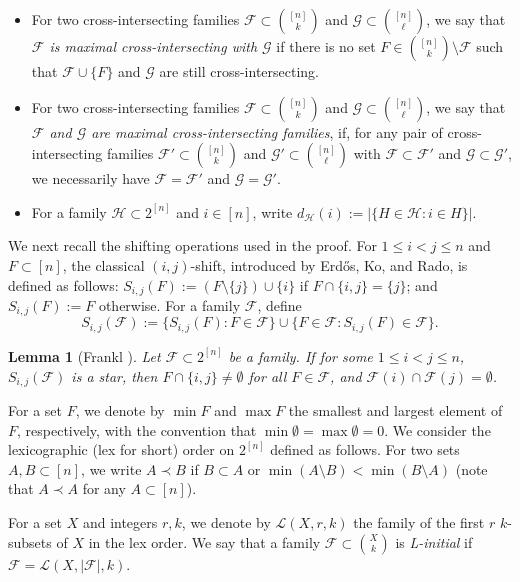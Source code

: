 \documentclass[a4paper,11pt]{article}
\newtheorem{lemma}[theorem]{Lemma}
\newcommand{\m}{\mathcal}
\begin{document}
\begin{itemize}
\item For two cross-intersecting families $\m F\subset {[n]\choose k}$ and $\m G \subset {[n]\choose \ell}$, we say that {\it $\m F$ is  maximal cross-intersecting with $\m G$} if there is no set $F\in {[n]\choose k}\setminus \m F$ such that $\m F \cup \{F\}$ and $\m G$ are still cross-intersecting.
\item For two cross-intersecting families $\m F\subset {[n]\choose k}$ and $\m G \subset {[n]\choose \ell}$, we say that 
{\it $\m F$ and $\m G$ are maximal cross-intersecting families}, if, for any pair of cross-intersecting families $\m F'\subset {[n]\choose k}$ and $\m G'\subset {[n]\choose \ell}$ with $\m F\subset \m F'$ and $\m G\subset \m G'$, we necessarily have $\m F= \m F'$ and $\m G= \m G'$.
\item For a family $\mathcal H\subset 2^{[n]}$ and $i\in[n]$, write $d_{\mathcal H}(i):=|\{H\in\mathcal H:i\in H\}|.$
\end{itemize}

We next recall the shifting operations used in the proof.
For $1\le i <j \le n$ and $F\subset [n]$, the classical $(i,j)$-shift, introduced by Erd\H{o}s, Ko, and Rado, is defined as follows: $S_{i,j}(F):=(F\setminus \{j\}) \cup \{i\}$ if $F\cap \{i,j\}=\{j\}$; and $S_{i,j}(F):=F$ otherwise. For a family $\m F$, define 
\[
S_{i,j}(\mathcal{F}) := \{ S_{i,j}(F) : F \in \mathcal{F} \} \cup \{ F \in \mathcal{F} : S_{i,j}(F) \in \mathcal{F} \}.
\]

\begin{lemma}[Frankl \cite{12-24-2}]\label{12-22-1}
Let $\mathcal{F}\subset 2^{[n]}$ be a family. If for some $1\le i<j \le n$, $S_{i,j}(\mathcal{F})$ is a star, then $F\cap \{i, j\}\ne \emptyset$ for all $F\in \mathcal{F}$, and $\mathcal{F}(i)\cap \mathcal{F}(j)=\emptyset$.
\end{lemma}

For a set $F$, we denote by $\min F$ and $\max F$ the smallest and largest element of $F$, respectively, 
with the convention that $\min \emptyset=\max \emptyset =0$.
We consider the lexicographic (lex for short) order on $2^{[n]}$ defined as follows. For two sets $A,B \subset [n]$, we write $A \prec B$ if $B\subset A$ or $\min (A\setminus B)<\min (B\setminus A)$ (note that $A\prec A$ for any $A\subset [n]$). 

For a set $X$ and integers $r,k$, we denote by $\m L(X,r,k)$ the family of the first $r$ $k$-subsets of $X$ in the lex  order.
We say that a family $\m F\subset {X\choose k}$ is {\it L-initial} if $\m F=\m L(X, |\m F|, k)$. 
\end{document}
